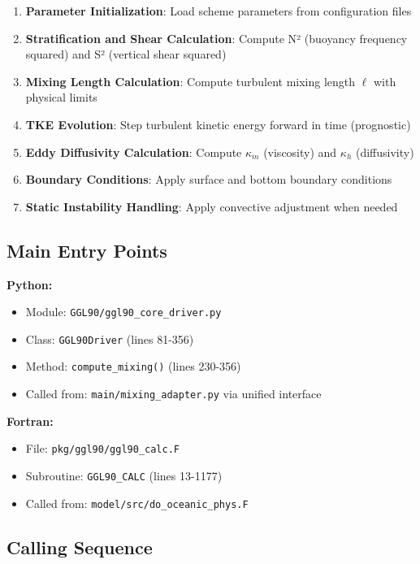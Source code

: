 \documentclass[11pt]{article}
\begin{document}
\begin{enumerate}
    \item \textbf{Parameter Initialization}: Load scheme parameters from configuration files
    \item \textbf{Stratification and Shear Calculation}: Compute N² (buoyancy frequency squared) and S² (vertical shear squared)
    \item \textbf{Mixing Length Calculation}: Compute turbulent mixing length $\ell$ with physical limits
    \item \textbf{TKE Evolution}: Step turbulent kinetic energy forward in time (prognostic)
    \item \textbf{Eddy Diffusivity Calculation}: Compute $\kappa_m$ (viscosity) and $\kappa_h$ (diffusivity)
    \item \textbf{Boundary Conditions}: Apply surface and bottom boundary conditions
    \item \textbf{Static Instability Handling}: Apply convective adjustment when needed
\end{enumerate}

\subsection{Main Entry Points}

\textbf{Python:}
\begin{itemize}
    \item Module: \verb|GGL90/ggl90_core_driver.py|
    \item Class: \verb|GGL90Driver| (lines 81-356)
    \item Method: \verb|compute_mixing()| (lines 230-356)
    \item Called from: \verb|main/mixing_adapter.py| via unified interface
\end{itemize}

\textbf{Fortran:}
\begin{itemize}
    \item File: \verb|pkg/ggl90/ggl90_calc.F|
    \item Subroutine: \verb|GGL90_CALC| (lines 13-1177)
    \item Called from: \verb|model/src/do_oceanic_phys.F|
\end{itemize}

\subsection{Calling Sequence}
\end{document}
